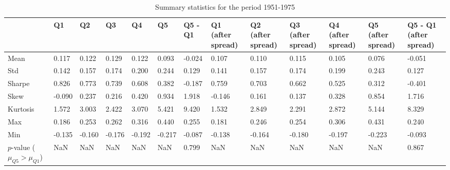 \begin{table}
\caption{Summary statistics for the period 1951-1975}
\label{tab:summary_1951_1975}
\begin{tabular}{lllllllllllll}
\toprule
 & Q1 & Q2 & Q3 & Q4 & Q5 & Q5 - Q1 & Q1 (after spread) & Q2 (after spread) & Q3 (after spread) & Q4 (after spread) & Q5 (after spread) & Q5 - Q1 (after spread) \\
\midrule
Mean & 0.117 & 0.122 & 0.129 & 0.122 & 0.093 & -0.024 & 0.107 & 0.110 & 0.115 & 0.105 & 0.076 & -0.051 \\
Std & 0.142 & 0.157 & 0.174 & 0.200 & 0.244 & 0.129 & 0.141 & 0.157 & 0.174 & 0.199 & 0.243 & 0.127 \\
Sharpe & 0.826 & 0.773 & 0.739 & 0.608 & 0.382 & -0.187 & 0.759 & 0.703 & 0.662 & 0.525 & 0.312 & -0.401 \\
Skew & -0.090 & 0.237 & 0.216 & 0.420 & 0.934 & 1.918 & -0.146 & 0.161 & 0.137 & 0.328 & 0.854 & 1.716 \\
Kurtosis & 1.572 & 3.003 & 2.422 & 3.070 & 5.421 & 9.420 & 1.532 & 2.849 & 2.291 & 2.872 & 5.144 & 8.329 \\
Max & 0.186 & 0.253 & 0.262 & 0.316 & 0.440 & 0.255 & 0.181 & 0.246 & 0.254 & 0.306 & 0.431 & 0.240 \\
Min & -0.135 & -0.160 & -0.176 & -0.192 & -0.217 & -0.087 & -0.138 & -0.164 & -0.180 & -0.197 & -0.223 & -0.093 \\
$p$-value ($\mu_{Q5} > \mu_{Q1}$) & NaN & NaN & NaN & NaN & NaN & 0.799 & NaN & NaN & NaN & NaN & NaN & 0.867 \\
\bottomrule
\end{tabular}
\end{table}

